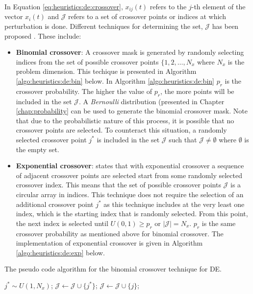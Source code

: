 In Equation \ref{eq:heuristics:de:crossover}, $x_{ij}(t)$ refers to the $j$-th element of the vector $x_{i}(t)$ and $\mathcal{J}$ refers to a set of crossover points or indices at which perturbation is done. Different techniques for determining the set, $\mathcal{J}$ has been proposed \cite{ref:storn:1996}\cite{ref:storn:1997}. These include:

\begin{itemize}
      \item \textbf{Binomial crossover}: A crossover mask is generated by randomly selecting indices from the set of possible crossover points $\{1,2,\dots,N_{x}$ where $N_{x}$ is the problem dimension. This techique is presented in Algorithm \ref{algo:heuristics:de:bin} below. In Algorithm \ref{algo:heuristics:de:bin} $p_{r}$ is the crossover probability. The higher the value of $p_{r}$, the more points will be included in the set $\mathcal{J}$. A \textit{Bernoulli} distribution (presented in Chapter \ref{chap:probability} can be used to generate the binomial crossover mask. Note that due to the probabilistic nature of this process, it is possible that no crossover points are selected. To counteract this situation, a randomly selected crossover point $j^{*}$ is included in the set $\mathcal{J}$ such that $\mathcal{J} \neq \emptyset$ where $\emptyset$ is the empty set.
      \item \textbf{Exponential crossover}: \citeauthor{ref:engelbrecht:2007}\cite{ref:engelbrecht:2007} states that with exponential crossover a sequence of adjacent crossover points are selected start from some randomly selected crossover index. This means that the set of possible crossover points $\mathcal{J}$ is a circular array in indices. This technique does not require the selection of an additional crossover point $j^{*}$ as this technique includes at the very least one index, which is the starting index that is randomly selected. From this point, the next index is selected until $U(0,1) \geq p_{r}$ or $|\mathcal{J}| = N_{x}$. $p_{r}$ is the same crossover probability as mentioned above for binomial crossover. The implementation of exponential crossover is given in Algorithm \ref{algo:heuristics:de:exp} below.
\end{itemize}

\begin{algorithm}[H]
      \caption{The pseudo code algorithm for the binomial crossover technique for \ac{DE}.}
      \label{algo:heuristics:de:bin}
      \begin{algorithmic}
            \State $j^{*} \sim U(1,N_{x})$;
            \State $\mathcal{J} \gets \mathcal{J} \cup \{j^{*}\}$;
            \State $\mathcal{J} \gets \mathcal{J} \cup \{j\}$;
            \EndIf
            \EndFor
      \end{algorithmic}
\end{algorithm}

